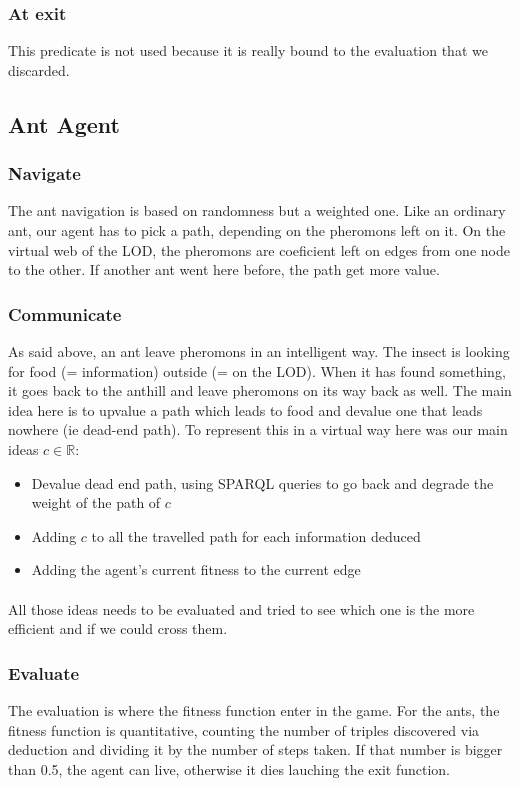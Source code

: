 \documentclass{article}
\newenvironment{itemh}[0]{\begin{itemize}[label=$\heartsuit$, font=\color{gray} \small]}{\end{itemize}}
\begin{document}
		\subsubsection{At exit}
			This predicate is not used because it is really bound to the evaluation that we discarded.
	\subsection{Ant Agent}
		\subsubsection{Navigate}
			The ant navigation is based on randomness but a weighted one.
			Like an ordinary ant, our agent has to pick a path, depending on the pheromons left on it.
			On the virtual web of the LOD, the pheromons are coeficient left on edges from one node to the other.
			If another ant went here before, the path get more value.			
		\subsubsection{Communicate}
			As said above, an ant leave pheromons in an intelligent way.
			The insect is looking for food (= information) outside (= on the LOD).
			When it has found something, it goes back to the anthill and leave pheromons on its way back as well.
			The main idea here is to upvalue a path which leads to food and devalue one that leads nowhere (ie dead-end path).
			To represent this in a virtual way here was our main ideas $c \in \mathbb{R}$:
			\begin{itemh}
				\item Devalue dead end path, using SPARQL queries to go back and degrade the weight of the path of $c$
				\item Adding $c$ to all the travelled path for each information deduced
				\item Adding the agent's current fitness to the current edge
			\end{itemh}
			\paragraph{}
				All those ideas needs to be evaluated and tried to see which one is the more efficient and if we could cross them.
		\subsubsection{Evaluate}
			The evaluation is where the fitness function enter in the game.
			For the ants, the fitness function is quantitative,
			counting the number of triples discovered via deduction and dividing it by the number of steps taken.
			If that number is bigger than 0.5, the agent can live, otherwise it dies lauching the exit function.
\end{document}
